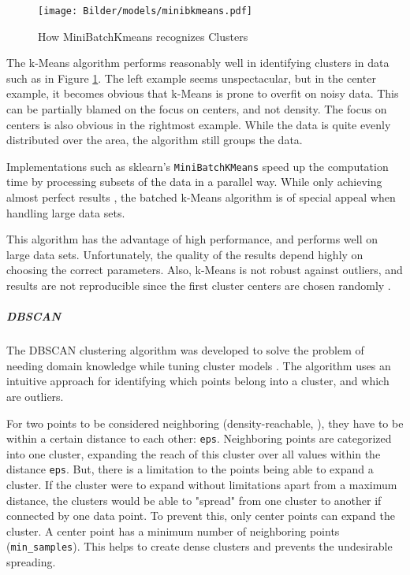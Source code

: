 			 \begin{figure}[!h]
		\centering
		\texttt{[image: Bilder/models/minibkmeans.pdf]}
		\caption[How MiniBatchKmeans recognizes Clusters]{How MiniBatchKmeans recognizes Clusters \cite{sklearn}}
		\label{fig:kmeans-viz}
		\end{figure}
	
		The k-Means algorithm performs reasonably well in identifying clusters in data such as in Figure \ref{fig:kmeans-viz}. The left example seems unspectacular, but in the center example, it becomes obvious that k-Means is prone to overfit on noisy data. This can be partially blamed on the focus on centers, and not density. The focus on centers is also obvious in the rightmost example. While the data is quite evenly distributed over the area, the algorithm still groups the data. 
		
		Implementations such as \ac{sklearn}'s \lstinline|MiniBatchKMeans| \cite{sklearn} speed up the computation time by processing subsets of the data in a parallel way. While only achieving almost perfect results \cite{sculleyWebscaleKmeansClustering2010}, the batched k-Means algorithm is of special appeal when handling large data sets.
		
		This algorithm has the advantage of high performance, and performs well on large data sets. Unfortunately, the quality of the results depend highly on choosing the correct parameters. Also, k-Means is not robust against outliers, and results are not reproducible since the first cluster centers are chosen randomly \cite[ch.~6.2]{40algorithms}.
		
		\subparagraph{\acl{DBSCAN}}
		The \ac{DBSCAN} clustering algorithm was developed to solve the problem of needing domain knowledge while tuning cluster models \cite[p.~226]{DBSCAN}. The algorithm uses an intuitive approach for identifying which points belong into a cluster, and which are outliers.

		For two points to be considered neighboring (density-reachable, \cite[p.~228]{DBSCAN}), they have to be within a certain distance to each other: \lstinline|eps|. Neighboring points are categorized into one cluster, expanding the reach of this cluster over all values within the distance \lstinline|eps|.
		But, there is a limitation to the points being able to expand a cluster. If the cluster were to expand without limitations apart from a maximum distance, the clusters would be able to "spread" from one cluster to another if connected by one data point.
		To prevent this, only center points can expand the cluster. A center point has a minimum number of neighboring points (\lstinline|min_samples|). This helps to create dense clusters and prevents the undesirable spreading.
		
